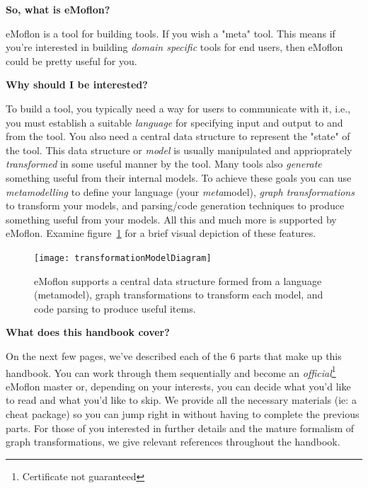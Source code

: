 {\bf \large So, what is eMoflon?}

eMoflon is a tool for building tools.  If you wish a "meta" tool.  This means if you're interested in building \emph{domain specific} tools for end users, then eMoflon could be pretty useful for you.


{\bf \large Why should I be interested?}

To build a tool, you typically need a way for users to communicate with it, i.e., you must establish a suitable \emph{language} for specifying input and output to and from the tool.  You also need a central data structure to represent the "state" of the tool.  This data structure or \emph{model} is usually manipulated and apprioprately \emph{transformed} in some useful manner by the tool.  Many tools also \emph{generate} something useful from their internal models. To achieve these goals you can use \emph{metamodelling} to define your language (your \emph{meta}model), \emph{graph transformations} to transform your models, and parsing/code generation techniques to produce something useful from your models. All this and much more is supported by eMoflon. Examine figure~\ref{fig:transModel} for a brief visual depiction of these features.

\begin{figure}[htbp]
	\centering
  \texttt{[image: transformationModelDiagram]}
	\caption{eMoflon supports a central data structure formed from a language (metamodel), graph transformations to transform each model, and code parsing to produce useful items.}
	\label{fig:transModel}
\end{figure}

{\bf \large What does this handbook cover?}

On the next few pages, we've described each of the 6 parts that make up this handbook. You can work through them sequentially and become an \emph{official}\footnote{Certificate not guaranteed} eMoflon master or, depending on your interests, you can decide what you'd like to read and what you'd like to skip. We provide all the necessary materials (ie: a cheat package) so you can jump right in without having to complete the previous parts. For those of you interested in further details and the mature formalism of graph transformations, we give relevant references throughout the handbook.

\pagebreak


